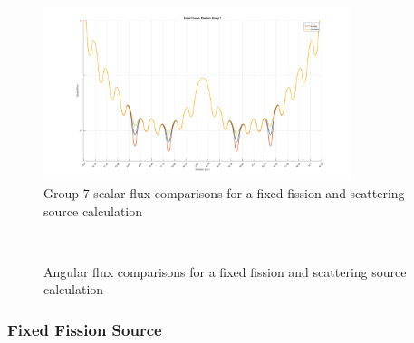 \begin{figure}[h]
    \centering
    \includegraphics[width=0.8\textwidth]{../figs/1dmoc-50mix-fixedscat-scalflux7.png}
    \caption{Group 7 scalar flux comparisons for a fixed fission and scattering source calculation}\label{f:1dmoc-fixed-50-scalflux7}
\end{figure}

\begin{figure}[h]
    \centering
    ~
    \caption{Angular flux comparisons for a fixed fission and scattering source calculation}\label{f:1dmoc-fixed-50-angflux}
\end{figure}

\subsubsection{Fixed Fission Source}

